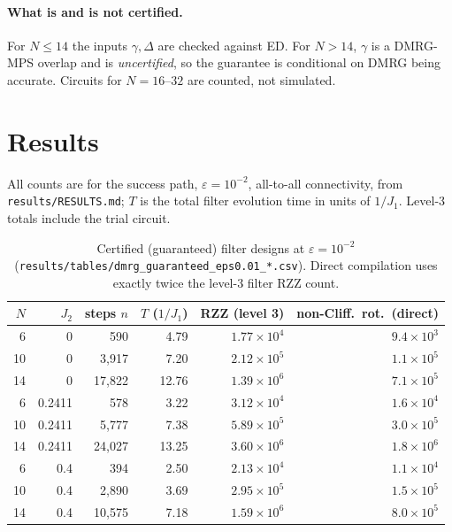 \documentclass[11pt]{article}
\newcommand{\eps}{\varepsilon}
\begin{document}
\paragraph{What is and is not certified.} For $N\le14$ the inputs $\gamma,\Delta$ are checked against ED. For
$N>14$, $\gamma$ is a DMRG-MPS overlap and is \emph{uncertified}, so the guarantee is conditional on DMRG being
accurate. Circuits for $N=16$--$32$ are counted, not simulated.

\section{Results}

All counts are for the success path, $\eps=10^{-2}$, all-to-all connectivity, from
\texttt{results/RESULTS.md}; $T$ is the total filter evolution time in units of $1/J_1$.
Level-3 totals include the trial circuit.

\begin{table}[h]
\centering
\begin{tabular}{rrrrrr}
\toprule
$N$ & $J_2$ & steps $n$ & $T$ ($1/J_1$) & RZZ (level 3) & non-Cliff.\ rot.\ (direct) \\
\midrule
 6 & 0      &    590 &  4.79 & $1.77\times10^{4}$ & $9.4\times10^{3}$ \\
10 & 0      &  3,917 &  7.20 & $2.12\times10^{5}$ & $1.1\times10^{5}$ \\
14 & 0      & 17,822 & 12.76 & $1.39\times10^{6}$ & $7.1\times10^{5}$ \\
\midrule
 6 & 0.2411 &    578 &  3.22 & $3.12\times10^{4}$ & $1.6\times10^{4}$ \\
10 & 0.2411 &  5,777 &  7.38 & $5.89\times10^{5}$ & $3.0\times10^{5}$ \\
14 & 0.2411 & 24,027 & 13.25 & $3.60\times10^{6}$ & $1.8\times10^{6}$ \\
\midrule
 6 & 0.4    &    394 &  2.50 & $2.13\times10^{4}$ & $1.1\times10^{4}$ \\
10 & 0.4    &  2,890 &  3.69 & $2.95\times10^{5}$ & $1.5\times10^{5}$ \\
14 & 0.4    & 10,575 &  7.18 & $1.59\times10^{6}$ & $8.0\times10^{5}$ \\
\bottomrule
\end{tabular}
\caption{Certified (guaranteed) filter designs at $\eps=10^{-2}$ (\texttt{results/tables/dmrg\_guaranteed\_eps0.01\_*.csv}).
Direct compilation uses exactly twice the level-3 filter RZZ count.}
\label{tab:cost}
\end{table}
\end{document}
